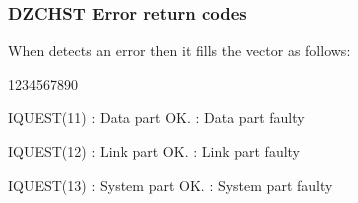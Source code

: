 \subsubsection*{DZCHST Error return codes}

When  detects an error then it fills the \Lit{\IQUEST} vector as follows:
\begin{DLtt}{1234567890}
\item[IQUEST(11)] : Data part OK.  : Data part faulty
\item[IQUEST(12)] : Link part OK.  : Link part faulty
\item[IQUEST(13)] : System part OK.  : System part faulty
\end{DLtt}
